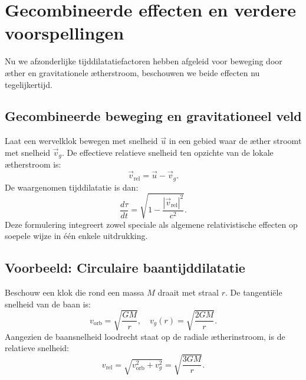 \section{Gecombineerde effecten en verdere voorspellingen}

Nu we afzonderlijke tijddilatatiefactoren hebben afgeleid voor beweging door æther en gravitationele ætherstroom, beschouwen we beide effecten nu tegelijkertijd.

\subsection*{Gecombineerde beweging en gravitationeel veld}

Laat een wervelklok bewegen met snelheid $\vec{u}$ in een gebied waar de æther stroomt met snelheid $\vec{v}_g$. De effectieve relatieve snelheid ten opzichte van de lokale ætherstroom is:
\[
    \vec{v}_\text{rel} = \vec{u} - \vec{v}_g.
\]
De waargenomen tijddilatatie is dan:
\[
    \frac{d\tau}{dt} = \sqrt{1 - \frac{|\vec{v}_\text{rel}|^2}{c^2}}. \tag{5}
\]
Deze formulering integreert zowel speciale als algemene relativistische effecten op soepele wijze in één enkele uitdrukking.

\subsection*{Voorbeeld: Circulaire baantijddilatatie}

Beschouw een klok die rond een massa $M$ draait met straal $r$. De tangentiële snelheid van de baan is:
\[
    v_\text{orb} = \sqrt{\frac{GM}{r}}, \quad v_g(r) = \sqrt{\frac{2GM}{r}}.
\]
Aangezien de baansnelheid loodrecht staat op de radiale ætherinstroom, is de relatieve snelheid:
\[
    v_\text{rel} = \sqrt{v_\text{orb}^2 + v_g^2} = \sqrt{\frac{3GM}{r}}.
\]

